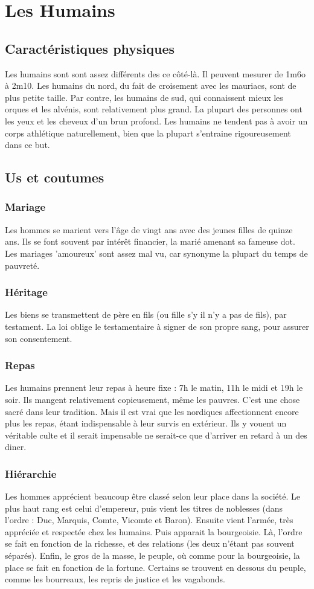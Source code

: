 \section{Les Humains}
\subsection{Caractéristiques physiques}
Les humains sont sont assez différents des ce côté-là. Il peuvent mesurer de 1m6o à 2m10. Les humains du nord, du fait de croisement avec les mauriacs, sont de plus petite taille. Par contre, les humains de sud, qui connaissent mieux les orques et les alvénis, sont relativement plus grand. La plupart des personnes ont les yeux et les cheveux d’un brun profond. Les humains ne tendent pas à avoir un corps athlétique naturellement, bien que la plupart s’entraine rigoureusement dans ce but. 
\subsection{Us et coutumes}
\subsubsection{Mariage}
Les hommes se marient vers l’âge de vingt ans avec des jeunes filles de quinze ans. Ils se font souvent par intérêt financier, la marié amenant sa fameuse dot. Les mariages ’amoureux’ sont assez mal vu, car synonyme la plupart du temps de pauvreté. 
\subsubsection{Héritage}
Les biens se transmettent de père en fils (ou fille s’y il n’y a pas de fils), par testament. La loi oblige le testamentaire à signer de son propre sang, pour assurer son consentement. 
\subsubsection{Repas}
Les humains prennent leur repas à heure fixe : 7h le matin, 11h le midi et 19h le soir. Ils mangent relativement copieusement, même les pauvres. C’est une chose sacré dans leur tradition. Mais il est vrai que les nordiques affectionnent encore plus les repas, étant indispensable à leur survis en extérieur. Ils y vouent un véritable culte et il serait impensable ne serait-ce que d'arriver en retard à un des diner. 
\subsubsection{Hiérarchie}
Les hommes apprécient beaucoup être classé selon leur place dans la société. Le plus haut rang est celui d’empereur, puis vient les titres de noblesses (dans l’ordre : Duc, Marquis, Comte, Vicomte et Baron). Ensuite vient l’armée, très appréciée et respectée chez les humains. Puis apparait la bourgeoisie. Là, l’ordre se fait en fonction de la richesse, et des relations (les deux n’étant pas souvent séparés). Enfin, le gros de la masse, le peuple, où comme pour la bourgeoisie, la place se fait en fonction de la fortune. Certains se trouvent en dessous du peuple, comme les bourreaux, les repris de justice et les vagabonds. 
